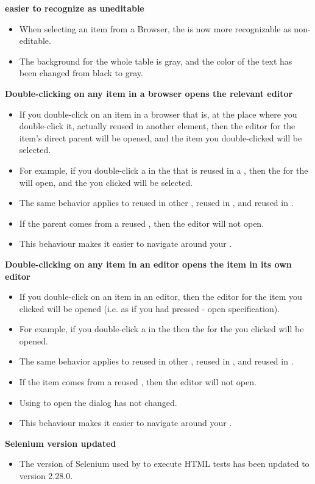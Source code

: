 \textbf{\gdpropview{} easier to recognize as uneditable}\\
\begin{itemize}
\item When selecting an item from a Browser, the \gdpropview{} is now more recognizable as non-editable.
\item The background for the whole table is gray, and the color of the text has been changed from black to gray.
\end{itemize}

\textbf{Double-clicking on any item in a browser opens the relevant editor}
\begin{itemize}
\item If you double-click on an item in a browser that is, at the place where you double-click it, actually reused in another element, then the editor for the item's direct parent will be opened, and the item you double-clicked will be selected. 
\item For example, if you double-click a \gdcase{} in the \gdtestsuitebrowser{} that is reused in a \gdsuite{}, then the \gdtestsuiteeditor{} for the \gdsuite{} will open, and the \gdcase{} you clicked will be selected.
\item The same behavior applies to \gdcases{} reused in other \gdcases{}, \gdsuites{} reused in \gdjobs{}, and \gdehandlers{} reused in \gdcases{}. 
\item If the parent comes from a reused \gdproject{}, then the editor will not open.
\item This behaviour makes it easier to navigate around your \gdproject{}. 
\end{itemize}

\textbf{Double-clicking on any item in an editor opens the item in its own editor}
\begin{itemize}
\item If you double-click on an item in an editor, then the editor for the item you clicked will be opened (i.e. as if you had pressed  - open specification). 
\item For example, if you double-click a \gdcase{} in the \gdtestsuitebrowser{} then the \gdtestcaseeditor{} for the \gdcase{} you clicked will be opened.
\item The same behavior applies to \gdcases{} reused in other \gdcases{}, \gdsuites{} reused in \gdjobs{}, and \gdehandlers{} reused in \gdcases{}. 
\item If the item comes from a reused \gdproject{}, then the editor will not open.
\item Using  to open the  dialog has not changed.
\item This behaviour makes it easier to navigate around your \gdproject{}. 
\end{itemize}

\textbf{Selenium version updated}
\begin{itemize}
\item The version of Selenium used by \app{} to execute HTML tests has been updated to version 2.28.0.
\end{itemize}
